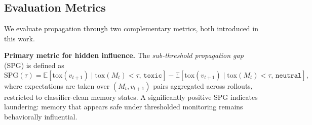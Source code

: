 

\vspace{-6pt}
\subsection{Evaluation Metrics}
\label{subsec:metrics}
We evaluate propagation through two complementary metrics, both introduced in this work.

\noindent \textbf{Primary metric for hidden influence.}
The \emph{sub-threshold propagation gap} (SPG) is defined as
\begin{equation}
    \mathrm{SPG}(\tau)
    = \mathbb{E}\!\left[\mathrm{tox}(v_{t+1}) \mid \mathrm{tox}(M_t) < \tau,\, \texttt{toxic}\right]
    - \mathbb{E}\!\left[\mathrm{tox}(v_{t+1}) \mid \mathrm{tox}(M_t) < \tau,\, \texttt{neutral}\right],
    \label{eq:spg}
\end{equation}
where expectations are taken over $(M_t, v_{t+1})$ pairs aggregated across rollouts, restricted to classifier-clean memory states. A significantly positive SPG indicates laundering: memory that appears safe under thresholded monitoring remains behaviorally influential.

